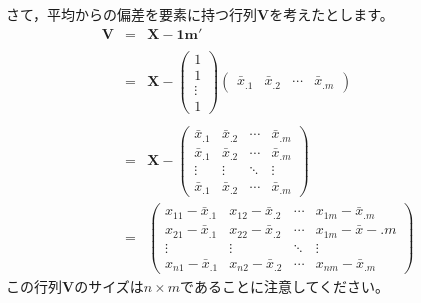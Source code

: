 \documentclass{ltjsbook}
\begin{document}
さて，平均からの偏差を要素に持つ行列$\bm{V}$を考えたとします。
\[
	\begin{array}{ccl}
		\bm{V} & = & \bm{X} - \bm{1} \bm{m}'                                                                                                                        \\
		       &   &                                                                                                                                                \\
		       & = & \bm{X} - \begin{pmatrix} 1 \\ 1 \\ \vdots \\ 1 \end{pmatrix} \begin{pmatrix} \bar{x}_{.1} & \bar{x}_{.2} & \cdots & \bar{x}_{.m} \end{pmatrix} \\
		       &   &                                                                                                                                                \\
		       & = & \bm{X} - \begin{pmatrix} \bar{x}_{.1} & \bar{x}_{.2} & \cdots & \bar{x}_{.m} \\
                \bar{x}_{.1} & \bar{x}_{.2} & \cdots & \bar{x}_{.m} \\
                \vdots       & \vdots       & \ddots & \vdots       \\
                \bar{x}_{.1} & \bar{x}_{.2} & \cdots & \bar{x}_{.m}\end{pmatrix}                                                                   \\
		       & = & \begin{pmatrix} x_{11}-\bar{x}_{.1}   & x_{12}-\bar{x}_{.2}   & \cdots & x_{1m} - \bar{x}_{.m} \\
                x_{21} - \bar{x}_{.1} & x_{22}-\bar{x}_{.2}   & \cdots & x_{1m} - \bar{x}-{.m} \\
                \vdots                & \vdots                & \ddots & \vdots                \\
                x_{n1} - \bar{x}_{.1} & x_{n2} - \bar{x}_{.2} & \cdots & x_{nm} - \bar{x}_{.m}
		             \end{pmatrix}
	\end{array}
\]
この行列$\bm{V}$のサイズは$n \times m$であることに注意してください。
\end{document}
